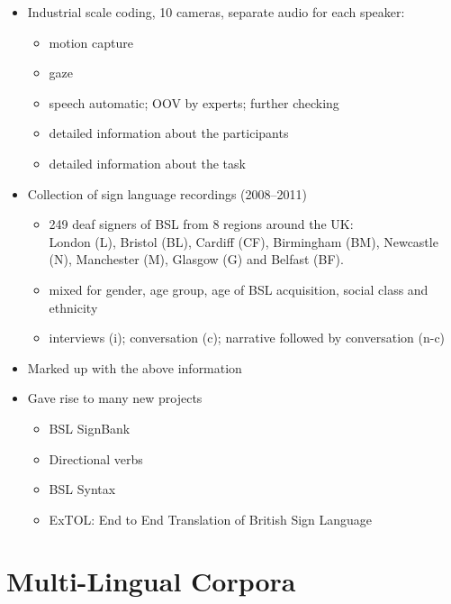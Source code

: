 \documentclass[a4paper,landscape,headrule,footrule,xetex]{foils}
\begin{document}
 \begin{itemize}
\item Industrial scale coding, 10 cameras, separate audio for each speaker:
  \begin{itemize}
  \item motion capture
  \item gaze
  \item speech automatic; OOV by experts; further checking
  \item detailed information about the participants
  \item detailed information about the task
  \end{itemize}
\end{itemize}



\begin{itemize}
\item Collection of sign language recordings (2008--2011)
  \begin{itemize}
  \item 249 deaf signers of BSL from 8 regions around the UK: 
    \\London (L), Bristol (BL), Cardiff (CF), Birmingham (BM), Newcastle (N), Manchester (M), Glasgow (G) and Belfast (BF).
  \item mixed for gender, age group, age of BSL acquisition, social class and ethnicity
  \item  interviews (i); conversation (c); narrative followed by conversation (n-c)
  \end{itemize}
\item Marked up with the above information
\item Gave rise to many new projects
  \begin{itemize}
  \item BSL SignBank
  \item Directional verbs
  \item BSL Syntax
  \item ExTOL: End to End Translation of British Sign Language
  \end{itemize}
\end{itemize}



\section{Multi-Lingual Corpora}
\MyLogo{}
\end{document}
